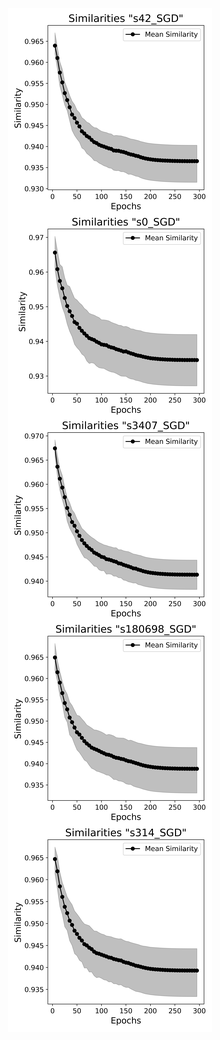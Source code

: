 \begin{figure}[h!]
      \centering
      \begin{subfigure}[b]{0.3\textwidth}
        \includegraphics[width=\textwidth]{figures/cifar_similarities_SGD_V2.png}

\end{subfigure}
\end{figure}
